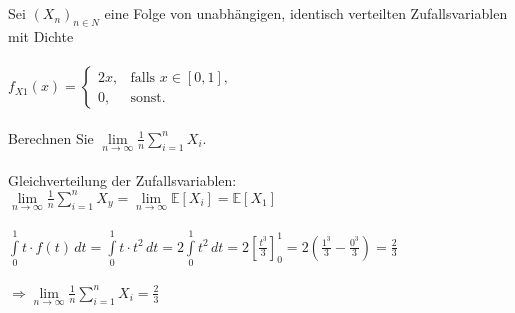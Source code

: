 \documentclass[a4paper]{article}
\begin{document}
\setcounter{section}{8}
\subsection{}
Sei $(X_n)_{n\in N}$ eine Folge von unabhängigen, identisch verteilten Zufallsvariablen mit Dichte\\\\
\(f_{X1}(x) = 
\begin{cases}
    2x, & \text{falls } x \in [0,1],\\
    0, & \text{sonst.}
\end{cases}\)\\\\
Berechnen Sie \(\lim\limits_{n\to\infty}\frac{1}{n}\sum\limits^n_{i=1}X_i\).\\\\
Gleichverteilung der Zufallsvariablen:\\
\(\lim\limits_{n\to\infty} \frac{1}{n}\sum\limits^n_{i=1} X_y = \lim\limits_{n\to\infty} \mathbb{E}[X_i]=\mathbb{E}[X_1]\)\\\\
\(\int\limits^1_0 t\cdot f(t)\, dt = \int\limits^1_0 t\cdot t ^2\, dt = 2 \int\limits^1_0 t^2\, dt = 2 \left[\frac{t^3}{3}\right]^1_0 = 2 \left(\frac{1^3}{3}-\frac{0^3}{3}\right)=\frac{2}{3}\)\\\\
\(\Rightarrow \lim\limits_{n\to\infty}\frac{1}{n}\sum\limits^n_{i=1}X_i=\frac{2}{3}\)
\end{document}
